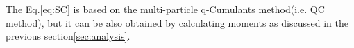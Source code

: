 The Eq.\ref{eq:SC} is based on the multi-particle q-Cumulants method(i.e. QC method), but it can be also obtained by calculating moments \cite{Bhalerao:2015jg} as discussed in the previous section\ref{sec:analysis}.


	\begin{figure}[bp]
		\begin{center}

\end{center}
\end{figure}
